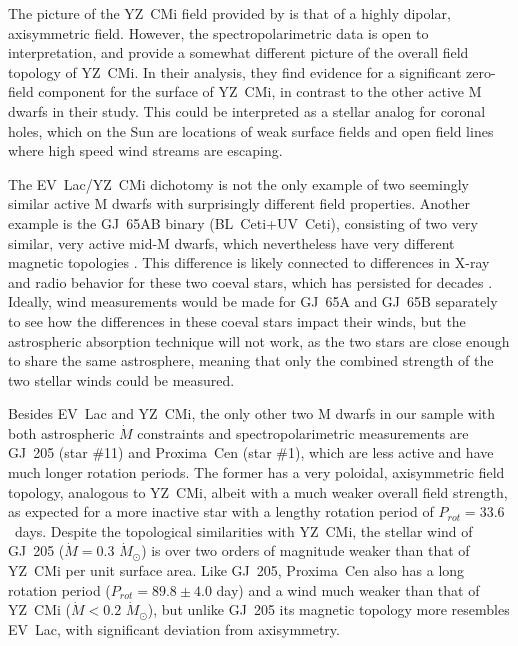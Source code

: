 \documentclass[preprint]{aastex}
\begin{document}
     The picture of the YZ~CMi field provided by \citet{jm08b} is
that of a highly dipolar, axisymmetric field.
However, the spectropolarimetric data is open to interpretation, and
\citet{ds14} provide a somewhat different picture of the
overall field topology of YZ~CMi.  In their analysis, they find evidence
for a significant zero-field component for the surface of YZ~CMi, in
contrast to the other active M dwarfs in their study.  This could be
interpreted as a stellar analog for coronal holes, which on the Sun are
locations of weak surface fields and open field lines where high speed
wind streams are escaping.

     The EV~Lac/YZ~CMi dichotomy is not the only example of two seemingly
similar active M dwarfs with surprisingly different field properties.
Another example is the GJ~65AB binary (BL~Ceti+UV~Ceti), consisting of two
very similar, very active mid-M dwarfs, which nevertheless have very different
magnetic topologies \citep{ok18}.  This difference is likely
connected to differences in X-ray and radio behavior for these two coeval stars,
which has persisted for decades \citep{deg81,ma03}.  Ideally,
wind measurements would be made for GJ~65A and GJ~65B separately to see how
the differences in these coeval stars impact their winds, but the astrospheric
absorption technique will not work,
as the two stars are close enough to share the same astrosphere, meaning
that only the combined strength of the two stellar winds could be measured. 

     Besides EV~Lac and YZ~CMi, the only other two M dwarfs in our
sample with both astrospheric $\dot{M}$ constraints and spectropolarimetric
measurements are GJ~205 (star \#11) and Proxima~Cen (star \#1),
which are less active and have much longer rotation
periods.  The former has a very poloidal, axisymmetric field
topology, analogous to YZ~CMi, albeit with a much weaker overall field
strength, as expected for a more inactive star with a lengthy
rotation period of $P_{rot}=33.6$~days.  Despite the topological
similarities with YZ~CMi, the stellar wind of GJ~205
($\dot{M}=0.3$ $\dot{M}_{\odot}$) is over two orders of magnitude weaker
than that of YZ~CMi per unit surface area.  Like GJ~205, Proxima~Cen also has a
long rotation period ($P_{rot}=89.8\pm 4.0$ day) and a wind much weaker than that
of YZ~CMi ($\dot{M}<0.2$ $\dot{M}_{\odot}$), but unlike GJ~205 its magnetic
topology more resembles EV~Lac, with significant deviation from axisymmetry.
\end{document}
